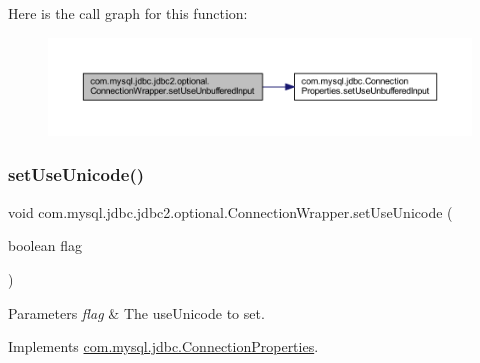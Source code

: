 Here is the call graph for this function\+:
\nopagebreak
\begin{figure}[H]
\begin{center}
\leavevmode
\includegraphics[width=350pt]{classcom_1_1mysql_1_1jdbc_1_1jdbc2_1_1optional_1_1_connection_wrapper_ad2f5596971575bf1d10abdea85e86509_cgraph}
\end{center}
\end{figure}
\mbox{\label{classcom_1_1mysql_1_1jdbc_1_1jdbc2_1_1optional_1_1_connection_wrapper_aad47efde1fa5f5f876ed766cf6b01a43}} 
\subsubsection{\texorpdfstring{set\+Use\+Unicode()}{setUseUnicode()}}
{\footnotesize\ttfamily void com.\+mysql.\+jdbc.\+jdbc2.\+optional.\+Connection\+Wrapper.\+set\+Use\+Unicode (\begin{DoxyParamCaption}\item[{boolean}]{flag }\end{DoxyParamCaption})}


\begin{DoxyParams}{Parameters}
{\em flag} & The use\+Unicode to set. \\
\hline
\end{DoxyParams}


Implements \mbox{\hyperlink{interfacecom_1_1mysql_1_1jdbc_1_1_connection_properties_a2b78e87d6cfd73e15066b8bdbc0cecb0}{com.\+mysql.\+jdbc.\+Connection\+Properties}}.

